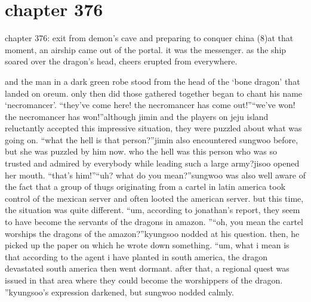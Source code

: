 \section{chapter 376}

chapter 376: exit from demon’s cave and preparing to conquer china (8)at that moment, an airship came out of the portal.
 it was the messenger.
 as the ship soared over the dragon’s head, cheers erupted from everywhere.





and the man in a dark green robe stood from the head of the ‘bone dragon’ that landed on oreum.
 only then did those gathered together began to chant his name ‘necromancer’.
“they’ve come here! the necromancer has come out!”“we’ve won! the necromancer has won!”although jimin and the players on jeju island reluctantly accepted this impressive situation, they were puzzled about what was going on.
“what the hell is that person?”jimin also encountered sungwoo before, but she was puzzled by him now.
who the hell was this person who was so trusted and admired by everybody while leading such a large army?jisoo opened her mouth.
“that’s him!”“uh? what do you mean?”sungwoo was also well aware of the fact that a group of thugs originating from a cartel in latin america took control of the mexican server and often looted the american server.
but this time, the situation was quite different.
“um, according to jonathan’s report, they seem to have become the servants of the dragons in amazon.
”“oh, you mean the cartel worships the dragons of the amazon?”kyungsoo nodded at his question.
 then, he picked up the paper on which he wrote down something.
“um, what i mean is that according to the agent i have planted in south america, the dragon devastated south america then went dormant.
 after that, a regional quest was issued in that area where they could become the worshippers of the dragon.
”kyungsoo’s expression darkened, but sungwoo nodded calmly.

